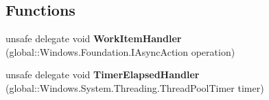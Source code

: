 \subsection*{Functions}
\begin{DoxyCompactItemize}
\item 
\mbox{\label{namespace_windows_1_1_system_1_1_threading_a769805986ae5b6ec1226a4378be1a430}} 
unsafe delegate void {\bfseries Work\+Item\+Handler} (global\+::\+Windows.\+Foundation.\+I\+Async\+Action operation)
\item 
\mbox{\label{namespace_windows_1_1_system_1_1_threading_ada9171ec7f44c5098d30412a2c392a5c}} 
unsafe delegate void {\bfseries Timer\+Elapsed\+Handler} (global\+::\+Windows.\+System.\+Threading.\+Thread\+Pool\+Timer timer)
\end{DoxyCompactItemize}
